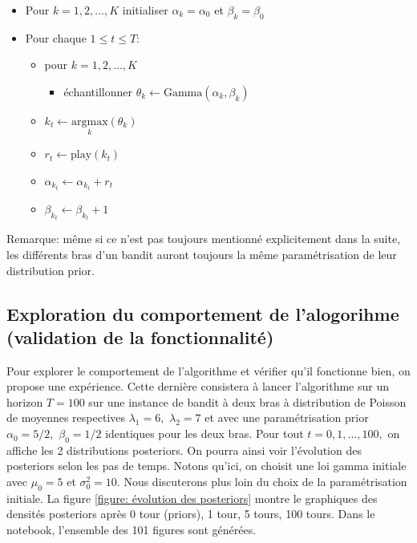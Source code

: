 \documentclass[letterpaper,11pt]{article}
\begin{document}
\begin{itemize}
\setlength\itemsep{0.2cm}

\item
Pour $k=1,2,...,K$ initialiser $\alpha_k=\alpha_0$ et $\beta_k=\beta_0$

\item Pour chaque $1\leq t \leq T :$

\begin{itemize}
\item
pour $k=1,2,...,K$

\begin{itemize}
\item
échantillonner $\theta_k \leftarrow \mathrm{Gamma}(\alpha_k,\beta_k)$

\end{itemize}

\item
$k_t\leftarrow \underset{k}{\mathrm{argmax}} (\theta_{k})$

\item
$r_t\leftarrow \mathrm{play}(k_t)$

\item 
$\alpha_{k_t} \leftarrow \alpha_{k_t}+r_t$

\item
$\beta_{k_t} \leftarrow \beta_{k_t}+1$

\end{itemize}

\end{itemize}

\vspace*{0.2cm}
Remarque: même si ce n'est pas toujours mentionné explicitement dans la suite, les différents bras d'un bandit auront toujours la même paramétrisation de leur distribution prior.

\subsection{Exploration du comportement de l'alogorihme (validation de la fonctionnalité)}

Pour explorer le comportement de l'algorithme et vérifier qu'il fonctionne bien, on propose une expérience. Cette dernière consistera à lancer l'algorithme sur un horizon $T=100$ sur une instance de bandit à deux bras à distribution de Poisson de moyennes respectives $\lambda_1=6,$ $\lambda_2=7$ et avec une paramétrisation prior $\alpha_0=5/2,$ $\beta_0=1/2$ identiques pour les deux bras. Pour tout $t=0,1,...,100,$ on affiche les 2 distributions posteriors. On pourra ainsi voir l'évolution des posteriors selon les pas de temps. Notons qu'ici, on choisit une loi gamma initiale avec $\mu_0=5$ et $\sigma_0^2=10.$ Nous discuterons plus loin du choix de la paramétrisation initiale. La figure \ref{figure: évolution des posteriors} montre le graphiques des densités posteriors après 0 tour (priors), 1 tour, 5 tours, 100 tours. Dans le notebook, l'ensemble des 101 figures sont générées. \\
\end{document}
